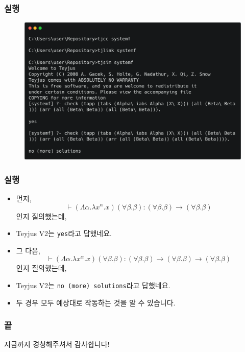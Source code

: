 \documentclass[slidestop,compress,mathserif]{beamer}
\begin{document}
    \begin{frame}
        \frametitle{실행}
        \begin{figure}[h]
            \begin{center}
                \includegraphics[width=1.0\linewidth]{fin.png}
            \end{center}
        \end{figure}
    \end{frame}

    \begin{frame}
        \frametitle{실행}
        \begin{itemize}
            \item 먼저, $$\vdash \left( \Lambda \alpha . \lambda x^{\alpha} . x \right) \left( \forall \beta . \beta \right) : \left( \forall \beta . \beta \right) \to \left( \forall \beta . \beta \right)$$인지 질의했는데,
            \item Teyjus V2는 \texttt{yes}라고 답했네요.
            \item 그 다음, $$\vdash \left( \Lambda \alpha . \lambda x^{\alpha} . x \right) \left( \forall \beta . \beta \right) : \left( \forall \beta . \beta \right) \to \left( \forall \beta . \beta \right) \to \left( \forall \beta . \beta \right)$$인지 질의했는데,
            \item Teyjus V2는 \texttt{no (more) solutions}라고 답했네요.
            \item 두 경우 모두 예상대로 작동하는 것을 알 수 있습니다.
        \end{itemize}
    \end{frame}
    
    \begin{frame}[c]
        \frametitle{끝}
        \centering
        지금까지 경청해주셔서 감사합니다!
    \end{frame}
\end{document}
